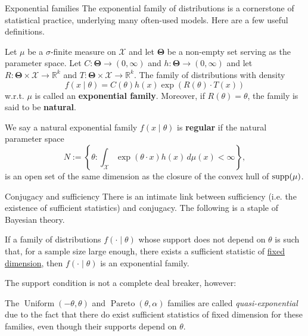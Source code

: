 \begin{frame}{Exponential families}
The exponential family of distributions is a cornerstone of statistical practice, underlying many often-used models. 
Here are a few useful definitions.
\begin{defn}
 \label{def:expo_family}
 Let $\mu$ be a $\sigma$-finite measure on $\mathcal{X}$ and let $\boldsymbol{\Theta}$ be a non-empty set serving as the parameter space.
 Let $C : \boldsymbol{\Theta} \to (0, \infty)$ and $h: \boldsymbol{\Theta} \to (0, \infty)$ and let $R : \boldsymbol{\Theta} \times \mathcal{X} \to \mathbb{R}^k$ and $T: \boldsymbol{\Theta} \times \mathcal{X} \to \mathbb{R}^k$.
 The family of distributions with density 
 \begin{equation*}
  f(x \mid \theta) = C(\theta)h(x)\exp\left(R(\theta) \cdot T(x) \right)
 \end{equation*}
 w.r.t. $\mu$ is called an \textbf{exponential family}.
 Moreover, if $R(\theta) = \theta$, the family is said to be \textbf{natural}.
\end{defn}
\begin{defn}
 We say a natural exponential family $f(x\mid\theta)$ is \textbf{regular} if the natural parameter space
 \begin{equation}
  N := \left\{ \theta : \int_{\mathcal{X}} \exp(\theta\cdot x) h(x)\,d\mu(x) < \infty \right\},
 \end{equation}
is an open set of the same dimension as the closure of the convex hull of $\operatorname{supp}(\mu)$.
\end{defn}
\end{frame}
\begin{frame}{Conjugacy and sufficiency}
There is an intimate link between sufficiency (i.e. the existence of sufficient statistics) and conjugacy.
The following is a staple of Bayesian theory.
\begin{theo}
 If a family of distributions $f(\cdot \mid \theta)$ whose support does not depend on $\theta$ is such that, for a sample size large enough, there exists a sufficient statistic of \underline{fixed dimension}, then $f(\cdot \mid \theta)$ is an exponential family.
\end{theo}
The support condition is not a complete deal breaker, however:
\begin{remark}
 The $\operatorname{Uniform}(-\theta, \theta)$ and $\operatorname{Pareto}(\theta, \alpha)$ families are called \textit{quasi-exponential} due to the fact that there do exist sufficient statistics of fixed dimension for these families, even though their supports depend on $\theta$.
\end{remark}
\end{frame}
